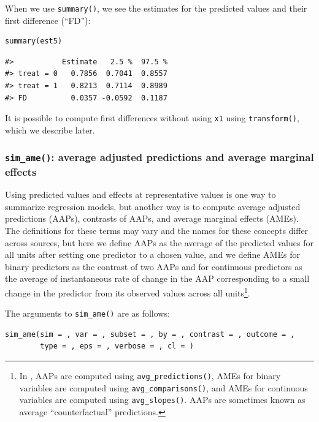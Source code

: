 When we use \texttt{summary()}, we see the estimates for the predicted values and their first difference (``FD''):

\begin{verbatim}
summary(est5)
\end{verbatim}

\begin{verbatim}
#>           Estimate   2.5 %  97.5 %
#> treat = 0   0.7856  0.7041  0.8557
#> treat = 1   0.8213  0.7114  0.8989
#> FD          0.0357 -0.0592  0.1187
\end{verbatim}

It is possible to compute first differences without using \texttt{x1} using \texttt{transform()}, which we describe later.

\hypertarget{sim_ame-average-adjusted-predictions-and-average-marginal-effects}{%
\subsubsection{\texorpdfstring{\texttt{sim\_ame()}: average adjusted predictions and average marginal effects}{sim\_ame(): average adjusted predictions and average marginal effects}}\label{sim_ame-average-adjusted-predictions-and-average-marginal-effects}}

Using predicted values and effects at representative values is one way to summarize regression models, but another way is to compute average adjusted predictions (AAPs), contrasts of AAPs, and average marginal effects (AMEs). The definitions for these terms may vary and the names for these concepts differ across sources, but here we define AAPs as the average of the predicted values for all units after setting one predictor to a chosen value, and we define AMEs for binary predictors as the contrast of two AAPs and for continuous predictors as the average of instantaneous rate of change in the AAP corresponding to a small change in the predictor from its observed values across all units\footnote{In , AAPs are computed using \texttt{avg\_predictions()}, AMEs for binary variables are computed using \texttt{avg\_comparisons()}, and AMEs for continuous variables are computed using \texttt{avg\_slopes()}. AAPs are sometimes known as average ``counterfactual'' predictions.}.

The arguments to \texttt{sim\_ame()} are as follows:

\begin{verbatim}
sim_ame(sim = , var = , subset = , by = , contrast = , outcome = ,
        type = , eps = , verbose = , cl = )
\end{verbatim}

